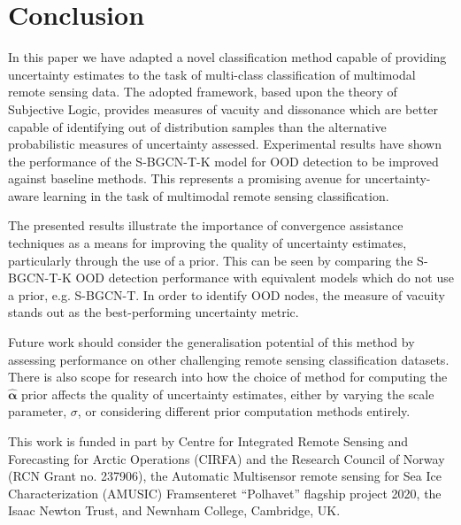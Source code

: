 \documentclass[
twocolumn,
]{ceurart}
\begin{document}
\section{Conclusion}
\label{sec::conclusion}

In this paper we have adapted a novel classification method capable of providing uncertainty estimates to the task of multi-class classification of multimodal remote sensing data.
The adopted framework, based upon the theory of Subjective Logic, provides measures of vacuity and dissonance which are better capable of identifying out of distribution samples than the alternative probabilistic measures of uncertainty assessed.
Experimental results have shown the performance of the S-BGCN-T-K model for OOD detection to be improved against baseline methods.
This represents a promising avenue for uncertainty-aware learning in the task of multimodal remote sensing classification.

The presented results illustrate the importance of convergence assistance techniques as a means for improving the quality of uncertainty estimates, particularly through the use of a prior.
This can be seen by comparing the S-BGCN-T-K OOD detection performance with equivalent models which do not use a prior, e.g. S-BGCN-T.
In order to identify OOD nodes, the measure of vacuity stands out as the best-performing uncertainty metric.

Future work should consider the generalisation potential of this method by assessing performance on other challenging remote sensing classification datasets.
There is also scope for research into how the choice of method for computing the $\hat{\boldsymbol{\alpha}}$ prior affects the quality of uncertainty estimates, either by varying the scale parameter, $\sigma$, or considering different prior computation methods entirely.
\begin{acknowledgments}
This work is funded in part by Centre for Integrated Remote Sensing and Forecasting for Arctic Operations (CIRFA) and the Research Council of Norway (RCN Grant no. 237906), the Automatic Multisensor remote sensing for Sea Ice Characterization (AMUSIC) Framsenteret ``Polhavet'' flagship project 2020, the Isaac Newton Trust, and Newnham College, Cambridge, UK.
\end{acknowledgments}


\end{document}
